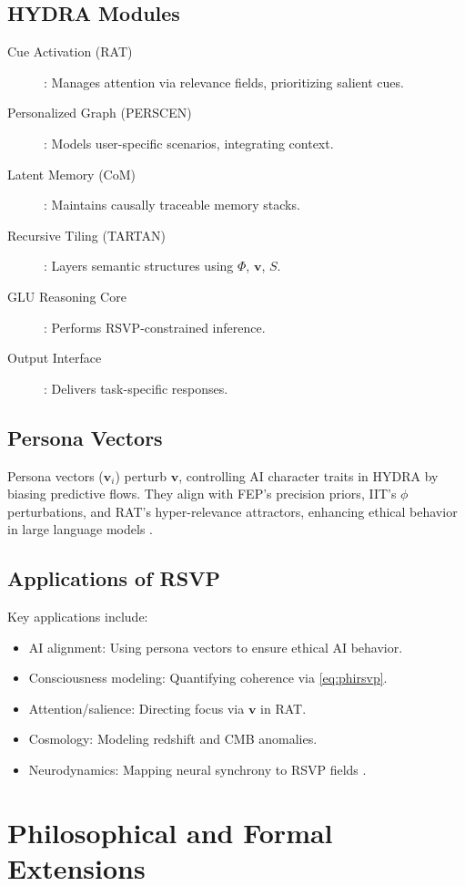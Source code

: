 \documentclass[12pt]{report}
\newcommand{\PhiRSVP}{\Phi}
\newcommand{\vRSVP}{\mathbf{v}}
\newcommand{\SRSVP}{S}
\begin{document}
{{\section{HYDRA Modules}
\begin{description}
    \item[Cue Activation (RAT)]: Manages attention via relevance fields, prioritizing salient cues.
    \item[Personalized Graph (PERSCEN)]: Models user-specific scenarios, integrating context.
    \item[Latent Memory (CoM)]: Maintains causally traceable memory stacks.
    \item[Recursive Tiling (TARTAN)]: Layers semantic structures using \(\PhiRSVP\), \(\vRSVP\), \(\SRSVP\).
    \item[GLU Reasoning Core]: Performs RSVP-constrained inference.
    \item[Output Interface]: Delivers task-specific responses.
\end{description}

\section{Persona Vectors}
Persona vectors (\(\mathbf{v}_i\)) perturb \(\vRSVP\), controlling AI character traits in HYDRA by biasing predictive flows. They align with FEP’s precision priors, IIT’s \(\phi\) perturbations, and RAT’s hyper-relevance attractors, enhancing ethical behavior in large language models \citep{Chen2025, HYDRA2025}.

\section{Applications of RSVP}
Key applications include:
\begin{itemize}
    \item AI alignment: Using persona vectors to ensure ethical AI behavior.
    \item Consciousness modeling: Quantifying coherence via \eqref{eq:phirsvp}.
    \item Attention/salience: Directing focus via \(\vRSVP\) in RAT.
    \item Cosmology: Modeling redshift and CMB anomalies.
    \item Neurodynamics: Mapping neural synchrony to RSVP fields \citep{RSVPMeta2025}.
\end{itemize}

\chapter{Philosophical and Formal Extensions}
}}
\end{document}
